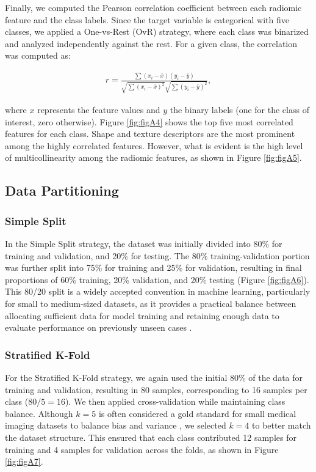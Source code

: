Finally, we computed the Pearson correlation coefficient between each radiomic
feature and the class labels. Since the target variable is categorical with
five classes, we applied a One-vs-Rest (OvR) strategy, where each class was
binarized and analyzed independently against the rest. For a given class, the
correlation was computed as:

\begin{align}
	r = \frac{\sum (x_i - \bar{x})(y_i - \bar{y})}{\sqrt{\sum (x_i - \bar{x})^2} \sqrt{\sum (y_i - \bar{y})^2}},
\end{align}

where \( x \) represents the feature values and \( y \) the binary labels (one
for the class of interest, zero otherwise). Figure \ref{fig:figA4} shows the
top five most correlated features for each class. Shape and texture descriptors
are the most prominent among the highly correlated features. However, what is
evident is the high level of multicollinearity among the radiomic features, as
shown in Figure \ref{fig:figA5}.

\subsection{Data Partitioning}

\subsubsection{Simple Split}

In the Simple Split strategy, the dataset was initially divided into 80\% for
training and validation, and 20\% for testing. The 80\% training-validation
portion was further split into 75\% for training and 25\% for validation,
resulting in final proportions of 60\% training, 20\% validation, and 20\%
testing (Figure \ref{fig:figA6}). This 80/20 split is a widely accepted
convention in machine learning, particularly for small to medium-sized
datasets, as it provides a practical balance between allocating sufficient data
for model training and retaining enough data to evaluate performance on
previously unseen cases \cite{beyond8020}.

\subsubsection{Stratified K-Fold}

For the Stratified K-Fold strategy, we again used the initial 80\% of the data
for training and validation, resulting in 80 samples, corresponding to 16
samples per class (\( 80/5 = 16 \)). We then applied cross-validation while
maintaining class balance. Although \( k=5 \) is often considered a gold
standard for small medical imaging datasets to balance bias and variance
\cite{vabalas2019}, we selected \( k=4 \) to better match the dataset
structure. This ensured that each class contributed 12 samples for training and
4 samples for validation across the folds, as shown in Figure \ref{fig:figA7}.

